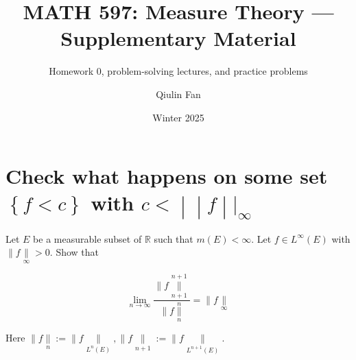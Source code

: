 \documentclass{qlnotes-export}
\title{MATH 597: Measure Theory --- Supplementary Material}
\subtitle{Homework 0, problem-solving lectures, and practice problems}
\author{Qiulin Fan}
\date{Winter 2025}
\begin{document}
\mainmatter
\chapter{\texorpdfstring{Check what happens on some set \(\left\{ {f < c} \right\}\) with \(\left. c < \middle| \middle| f \middle| |_{\infty} \right.\)}{Check what happens on some set \textbackslash left\textbackslash\{ \{f \textless{} c\} \textbackslash right\textbackslash\} with \textbackslash left. c \textless{} \textbackslash middle\textbar{} \textbackslash middle\textbar{} f \textbackslash middle\textbar{} \textbar\_\{\textbackslash infty\} \textbackslash right.}}\label{check-what-happens-on-some-set-fc-with-cf_infty}

Let \(E\) be a measurable subset of \(\mathbb{R}\) such that \(m(E) < \infty\). Let \(f \in L^{\infty}(E)\) with \(\parallel f\underset{\infty}{\parallel} > 0\). Show that

\[\lim\limits_{n\rightarrow\infty}\frac{\parallel f\underset{n + 1}{\overset{n + 1}{\parallel}}}{\parallel f\underset{n}{\overset{n}{\parallel}}} = \parallel f\underset{\infty}{\parallel}\]

Here \(\parallel f\underset{n}{\parallel} := \parallel f\underset{L^{n}(E)}{\parallel}, \parallel f\underset{n + 1}{\parallel} := \parallel f\underset{L^{n + 1}(E)}{\parallel}\).
\end{document}
